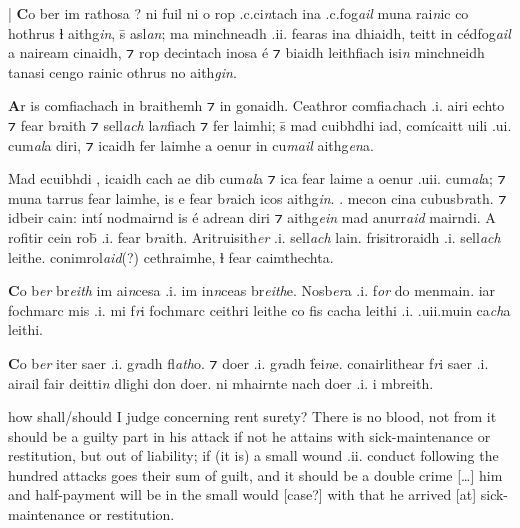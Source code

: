 \documentclass[11pt]{article}
\begin{document}
\begin{pages}
\begin{Leftside}
    \beginnumbering
    \pstart
    | \textbf{C}o ber  im rathosa ? ni fuil ni o rop .c.ci\emph{n}tach ina .c.fog\emph{ail} muna rai\emph{n}ic co hothrus ɫ aithg\emph{in}, \={s} asl\emph{an}; ma minchneadh .ii. fearas ina dhiaidh, teitt in c\'{e}dfog\emph{ail} a naiream cinaidh, ⁊ rop decintach inosa \'{e} ⁊ biaidh leithfiach isi\emph{n} minchneidh tanasi cengo rainic othrus no aith\emph{gin}.
    \pend

    \pstart
    \textbf{A}r is comfiachach in braithemh ⁊ in gonaidh.  Ceathror comfia\emph{c}hach .i. airi echto ⁊ fear b\emph{r}aith ⁊ sell\emph{ach} la\emph{n}fiach ⁊ fer laimhi; \={s} mad cuibhdhi iad, com\'{i}caitt uili .ui. cum\emph{al}a diri, ⁊ icaidh fer laimhe a oenur in cu\emph{mail} aithg\emph{en}a. 
    \pend

    \pstart
    Mad ecuibhdi , icaidh cach ae dib  cum\emph{al}a ⁊ ica fear laime a oenur .uii. cum\emph{al}a; ⁊ muna tarrus fear laimhe, is e fear b\emph{r}aich icos aithg\emph{in}. . mecon cina cubusb\emph{r}ath.  ⁊ idbeir cain: int\'{i} nodmairnd is \'{e} adrean diri ⁊ aithg\emph{ein} mad anurr\emph{aid} mairndi. A rofitir cein ro\={b} .i. fear b\emph{r}aith. Aritruisith\emph{er} .i. sell\emph{ach} lain. frisitroraidh .i. sell\emph{ach} leithe. conimrol\emph{aid}(?)  cethraimhe, ɫ fear caimthechta.
    \pend

    \pstart
    \textbf{C}o b\emph{er} br\emph{eith} im ai\emph{n}cesa .i. im in\emph{n}ceas br\emph{eith}e. Nosb\emph{er}a .i. f\emph{or} do menmain. iar fochmarc mis .i. mi f\emph{r}i fochmarc ceithri leithe co fis cacha leithi .i. .uii.muin ca\emph{ch}a leithi.
    \pend

    \pstart
    \textbf{C}o b\emph{er}  iter saer .i. g\emph{r}adh fl\emph{ath}o. ⁊ doer .i. g\emph{r}adh \.{f}ei\emph{n}e.  conairlithear f\emph{r}i saer .i. airail fair deitti\emph{n} dlighi don doer. ni mhairnte nach doer .i. i mbreith. 
    \pend
    \endnumbering
  \end{Leftside}

\begin{Rightside}
    \beginnumbering
   \pstart
   how shall/should I judge concerning rent surety? There is no blood, not from it should be a guilty part in his attack if not he attains with sick-maintenance or restitution, but out of liability; if (it is) a small wound .ii. conduct following the hundred attacks goes their sum of guilt, and it should be a double crime [\ldots] him and half-payment will be in the small would [case?] with that he arrived [at] sick-maintenance or restitution. 
   \pend


\end{Rightside}
\end{pages}
\end{document}
